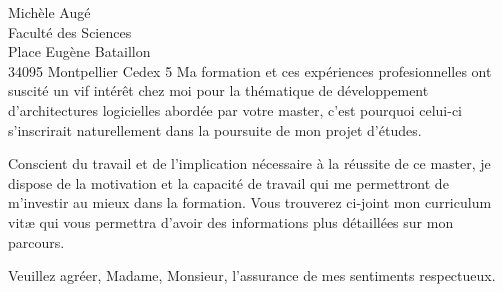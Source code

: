 \documentclass{lettre}
\begin{document}
\begin{letter}{
    Michèle Augé\\
    Faculté des Sciences\\
    Place Eugène Bataillon\\
    34095 Montpellier Cedex 5
}
    Ma formation et ces expériences profesionnelles ont suscité un vif intérêt chez moi pour la thématique de développement d'architectures logicielles abordée par votre master, c'est pourquoi celui-ci s'inscrirait naturellement dans la poursuite de mon projet d'études.

    Conscient du travail et de l'implication nécessaire à la réussite de ce master, je dispose de la motivation et la capacité de travail qui me permettront de m'investir au mieux dans la formation. Vous trouverez ci-joint mon curriculum vit\ae{} qui vous permettra d'avoir des informations plus détaillées sur mon parcours.

    \closing{Veuillez agréer, Madame, Monsieur, l'assurance de mes sentiments respectueux.}
\end{letter}
\end{document}
